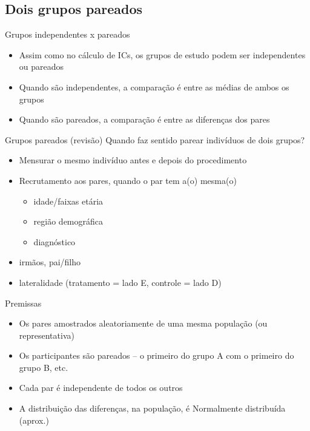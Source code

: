 \documentclass{beamer}
\begin{document}
\subsection{Dois grupos pareados}

\begin{frame}{\scriptsize Grupos independentes x pareados}
  \begin{itemize}
    \footnotesize
  \item Assim como no cálculo de ICs, os grupos de estudo podem ser independentes ou pareados
  \item Quando são independentes, a comparação é entre as médias de ambos os grupos
  \item Quando são pareados, a comparação é entre as diferenças dos pares
  \end{itemize}
\end{frame}


\begin{frame}{\scriptsize Grupos pareados (revisão)}
Quando faz sentido parear indivíduos de dois grupos?
  \begin{itemize}
    \footnotesize
  \item Mensurar o \alert{mesmo} indivíduo antes e depois do procedimento
  \item Recrutamento aos pares, quando o par tem a(o) mesma(o)
    \begin{itemize}
    \footnotesize
    \item idade/faixas etária
    \item região demográfica
    \item diagnóstico
    \end{itemize}
  \item irmãos, pai/filho
  \item lateralidade (tratamento = lado E, controle = lado D)
  \end{itemize}
\end{frame}

\begin{frame}{\scriptsize Premissas}
  \begin{itemize}
    \footnotesize
  \item Os pares amostrados aleatoriamente de uma mesma população (ou representativa)
  \item Os participantes são pareados -- o primeiro do grupo A com o primeiro do grupo B, etc.
  \item Cada par é independente de todos os outros
  \item A distribuição das diferenças, na população, é Normalmente distribuída (aprox.)
  \end{itemize}
\end{frame}
\end{document}
